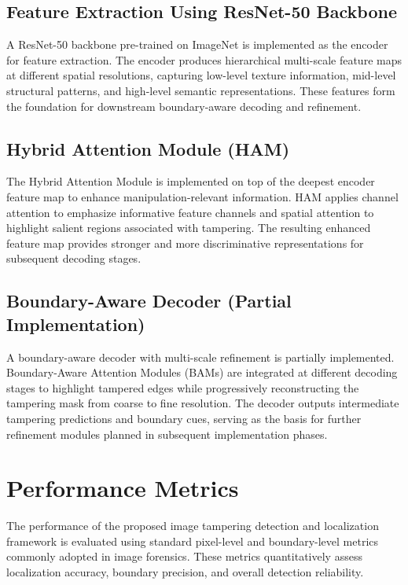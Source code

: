 \documentclass[runningheads]{llncs}
\begin{document}
\subsection{Feature Extraction Using ResNet-50 Backbone}

A ResNet-50 backbone pre-trained on ImageNet is implemented as the encoder for feature extraction. The encoder produces hierarchical multi-scale feature maps at different spatial resolutions, capturing low-level texture information, mid-level structural patterns, and high-level semantic representations. These features form the foundation for downstream boundary-aware decoding and refinement.

\subsection{Hybrid Attention Module (HAM)}

The Hybrid Attention Module is implemented on top of the deepest encoder feature map to enhance manipulation-relevant information. HAM applies channel attention to emphasize informative feature channels and spatial attention to highlight salient regions associated with tampering. The resulting enhanced feature map provides stronger and more discriminative representations for subsequent decoding stages.

\subsection{Boundary-Aware Decoder (Partial Implementation)}

A boundary-aware decoder with multi-scale refinement is partially implemented. Boundary-Aware Attention Modules (BAMs) are integrated at different decoding stages to highlight tampered edges while progressively reconstructing the tampering mask from coarse to fine resolution. The decoder outputs intermediate tampering predictions and boundary cues, serving as the basis for further refinement modules planned in subsequent implementation phases.





\section{Performance Metrics}

The performance of the proposed image tampering detection and localization framework is evaluated using standard pixel-level and boundary-level metrics commonly adopted in image forensics. These metrics quantitatively assess localization accuracy, boundary precision, and overall detection reliability.
\end{document}
